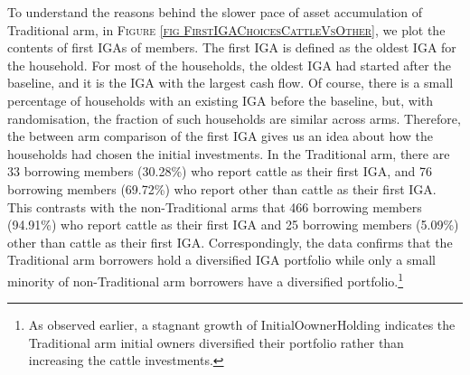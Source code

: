 	To understand the reasons behind the slower pace of asset accumulation of \textsf{Traditional} arm,
in \textsc{\footnotesize Figure \ref{fig FirstIGAChoicesCattleVsOther}}, we plot the contents of first IGAs of members. The first IGA is defined as the oldest IGA for the household. For most of the households, the oldest IGA had started after the baseline, and it is the IGA with the largest cash flow. Of course, there is a small percentage of households with an existing IGA before the baseline, but, with randomisation, the fraction of such households are similar across arms. Therefore, the between arm comparison of the first IGA gives us an idea about how the households had chosen the initial investments. 
In the \textsf{Traditional} arm, there are 33 borrowing members (30.28\%) who report cattle as their first IGA, and 76 borrowing members (69.72\%) who report other than cattle as their first IGA. 
This contrasts with the non-\textsf{Traditional} arms that 466 borrowing members (94.91\%)
who report cattle as their first IGA and 25 borrowing members (5.09\%) other than cattle as their first IGA. 
Correspondingly, the data confirms that the \textsf{Traditional} arm borrowers hold a diversified IGA portfolio while only a small minority of non-\textsf{Traditional} arm borrowers have a diversified portfolio.\footnote{As observed earlier, a stagnant growth of \textsf{InitialOownerHolding} indicates the \textsf{Traditional} arm initial owners diversified their portfolio rather than increasing the cattle investments. }  

